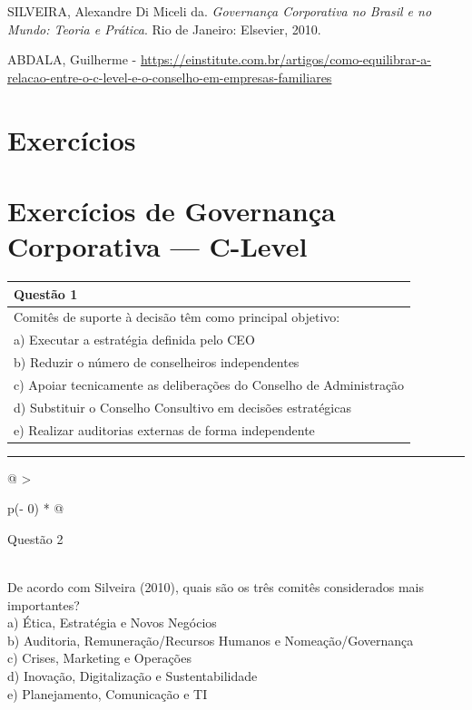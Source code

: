 \documentclass[
]{book}
\begin{document}
SILVEIRA, Alexandre Di Miceli da. \emph{Governança Corporativa no Brasil e no Mundo: Teoria e Prática}. Rio de Janeiro: Elsevier, 2010.

ABDALA, Guilherme - \url{https://einstitute.com.br/artigos/como-equilibrar-a-relacao-entre-o-c-level-e-o-conselho-em-empresas-familiares}

\section{Exercícios}\label{exercuxedcios-3}

\section{Exercícios de Governança Corporativa --- C-Level}\label{exercuxedcios-de-governanuxe7a-corporativa-c-level}

\begin{longtable}[]{@{}l@{}}
\toprule\noalign{}
Questão 1 \\
\midrule\noalign{}
\endhead
\bottomrule\noalign{}
\endlastfoot
Comitês de suporte à decisão têm como principal objetivo: \\
a) Executar a estratégia definida pelo CEO \\
b) Reduzir o número de conselheiros independentes \\
c) Apoiar tecnicamente as deliberações do Conselho de Administração \\
d) Substituir o Conselho Consultivo em decisões estratégicas \\
e) Realizar auditorias externas de forma independente \\
\end{longtable}

\begin{center}\rule{0.5\linewidth}{0.5pt}\end{center}

\begin{longtable}[]{@{}
  >{\raggedright\arraybackslash}p{(\columnwidth - 0\tabcolsep) * }@{}}
\toprule\noalign{}
\begin{minipage}[b]{\linewidth}\raggedright
Questão 2
\end{minipage} \\
\midrule\noalign{}
\endhead
\bottomrule\noalign{}
\endlastfoot
De acordo com Silveira (2010), quais são os três comitês considerados mais importantes? \\
a) Ética, Estratégia e Novos Negócios \\
b) Auditoria, Remuneração/Recursos Humanos e Nomeação/Governança \\
c) Crises, Marketing e Operações \\
d) Inovação, Digitalização e Sustentabilidade \\
e) Planejamento, Comunicação e TI \\
\end{longtable}
\end{document}
